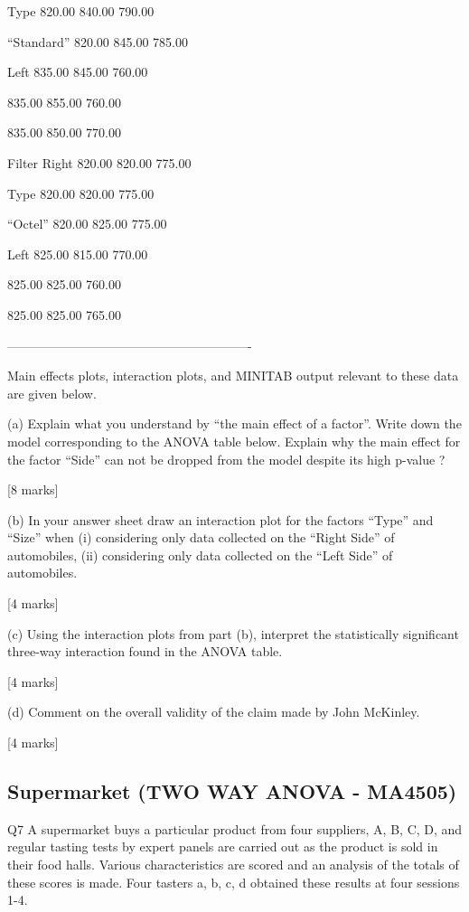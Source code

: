 Type 820.00 840.00 790.00

“Standard” 820.00 845.00 785.00

Left 835.00 845.00 760.00

835.00 855.00 760.00

835.00 850.00 770.00

Filter Right 820.00 820.00 775.00

Type 820.00 820.00 775.00

“Octel” 820.00 825.00 775.00

Left 825.00 815.00 770.00

825.00 825.00 760.00

825.00 825.00 765.00

----------------------------------------------------------



Main effects plots, interaction plots, and MINITAB output relevant to these data are given below.

(a) Explain what you understand by “the main effect of a factor”. Write down the model corresponding to the ANOVA table below. Explain why the main effect for the factor “Side” can not be dropped from the model despite its high p-value ?

[8 marks]

(b) In your answer sheet draw an interaction plot for the factors “Type” and “Size” when (i) considering only data collected on the “Right Side” of automobiles, (ii) considering only data collected on the “Left Side” of automobiles.

[4 marks]

(c) Using the interaction plots from part (b), interpret the statistically significant three-way interaction found in the ANOVA table.

[4 marks]

(d) Comment on the overall validity of the claim made by John McKinley.

[4 marks]

\newpage
\subsection{Supermarket (TWO WAY ANOVA - MA4505)}

Q7 A supermarket buys a particular product from four suppliers, A, B, C, D, and regular tasting tests by expert panels 
are carried out as the product is sold in their food halls. 
Various characteristics are scored and an analysis of the totals of these scores is made. 
Four tasters a, b, c, d obtained these results at four sessions 1-4.

